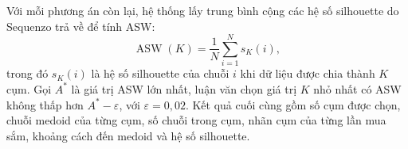 \documentclass[../LuanVan.tex]{subfiles}
\begin{document}
Với mỗi phương án còn lại, hệ thống lấy trung bình cộng các hệ số silhouette do Sequenzo trả về để tính ASW:
\begin{equation}
    \operatorname{ASW}(K)=\frac{1}{N}\sum_{i=1}^{N}s_K(i),
    \label{eq:ch3_asw_implementation}
\end{equation}
trong đó $s_K(i)$ là hệ số silhouette của chuỗi $i$ khi dữ liệu được chia thành $K$ cụm. Gọi $A^*$ là giá trị ASW lớn nhất, luận văn chọn giá trị $K$ nhỏ nhất có ASW không thấp hơn $A^*-\varepsilon$, với $\varepsilon=0{,}02$. Kết quả cuối cùng gồm số cụm được chọn, chuỗi medoid của từng cụm, số chuỗi trong cụm, nhãn cụm của từng lần mua sắm, khoảng cách đến medoid và hệ số silhouette.
\end{document}
